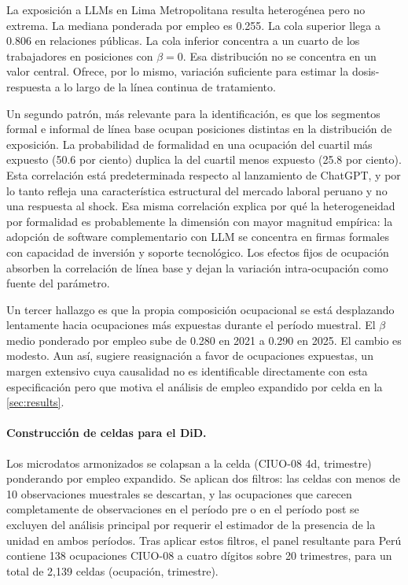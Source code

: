La exposici\'{o}n a LLMs en Lima Metropolitana resulta heterog\'{e}nea pero no extrema. La mediana ponderada por empleo es 0.255. La cola superior llega a 0.806 en relaciones p\'{u}blicas. La cola inferior concentra a un cuarto de los trabajadores en posiciones con $\beta = 0$. Esa distribuci\'{o}n no se concentra en un valor central. Ofrece, por lo mismo, variaci\'{o}n suficiente para estimar la dosis-respuesta a lo largo de la l\'{i}nea continua de tratamiento.

Un segundo patr\'{o}n, m\'{a}s relevante para la identificaci\'{o}n, es que los segmentos formal e informal de l\'{i}nea base ocupan posiciones distintas en la distribuci\'{o}n de exposici\'{o}n. La probabilidad de formalidad en una ocupaci\'{o}n del cuartil m\'{a}s expuesto (50.6 por ciento) duplica la del cuartil menos expuesto (25.8 por ciento). Esta correlaci\'{o}n est\'{a} predeterminada respecto al lanzamiento de ChatGPT, y por lo tanto refleja una caracter\'{i}stica estructural del mercado laboral peruano y no una respuesta al shock. Esa misma correlaci\'{o}n explica por qu\'{e} la heterogeneidad por formalidad es probablemente la dimensi\'{o}n con mayor magnitud emp\'{i}rica: la adopci\'{o}n de software complementario con LLM se concentra en firmas formales con capacidad de inversi\'{o}n y soporte tecnol\'{o}gico. Los efectos fijos de ocupaci\'{o}n absorben la correlaci\'{o}n de l\'{i}nea base y dejan la variaci\'{o}n intra-ocupaci\'{o}n como fuente del par\'{a}metro.

Un tercer hallazgo es que la propia composici\'{o}n ocupacional se est\'{a} desplazando lentamente hacia ocupaciones m\'{a}s expuestas durante el per\'{i}odo muestral. El $\beta$ medio ponderado por empleo sube de 0.280 en 2021 a 0.290 en 2025. El cambio es modesto. Aun as\'{i}, sugiere reasignaci\'{o}n a favor de ocupaciones expuestas, un margen extensivo cuya causalidad no es identificable directamente con esta especificaci\'{o}n pero que motiva el an\'{a}lisis de empleo expandido por celda en la \cref{sec:results}.

\paragraph{Construcci\'{o}n de celdas para el DiD.} Los microdatos armonizados se colapsan a la celda (CIUO-08 4d, trimestre) ponderando por empleo expandido. Se aplican dos filtros: las celdas con menos de 10 observaciones muestrales se descartan, y las ocupaciones que carecen completamente de observaciones en el per\'{i}odo pre o en el per\'{i}odo post se excluyen del an\'{a}lisis principal por requerir el estimador de \citet{CallawayCGBS2024_continuous} la presencia de la unidad en ambos per\'{i}odos. Tras aplicar estos filtros, el panel resultante para Per\'{u} contiene 138 ocupaciones CIUO-08 a cuatro d\'{i}gitos sobre 20 trimestres, para un total de 2{,}139 celdas (ocupaci\'{o}n, trimestre).
